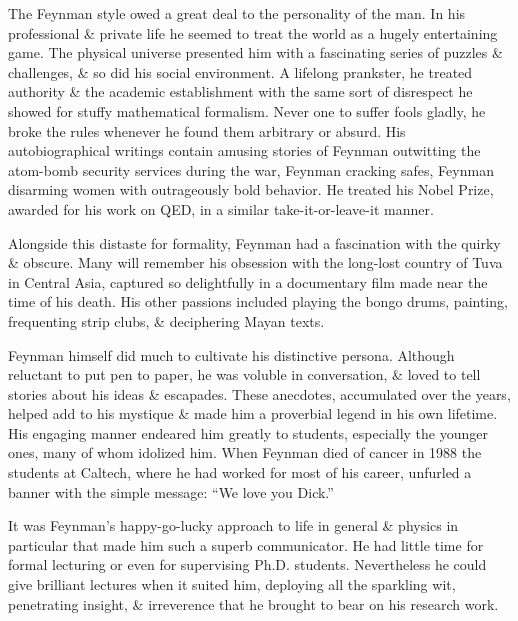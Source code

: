 \documentclass{article}
\begin{document}
The {\sc Feynman} style owed a great deal to the personality of the man. In his professional \& private life he seemed to treat the world as a hugely entertaining game. The physical universe presented him with a fascinating series of puzzles \& challenges, \& so did his social environment. A lifelong prankster, he treated authority \& the academic establishment with the same sort of disrespect he showed for stuffy mathematical formalism. Never one to suffer fools gladly, he broke the rules whenever he found them arbitrary or absurd. His autobiographical writings contain amusing stories of {\sc Feynman} outwitting the atom-bomb security services during the war, {\sc Feynman} cracking safes, {\sc Feynman} disarming women with outrageously bold behavior. He treated his Nobel Prize, awarded for his work on QED, in a similar take-it-or-leave-it manner.

Alongside this distaste for formality, {\sc Feynman} had a fascination with the quirky \& obscure. Many will remember his obsession with the long-lost country of Tuva in Central Asia, captured so delightfully in a documentary film made near the time of his death. His other passions included playing the bongo drums, painting, frequenting strip clubs, \& deciphering Mayan texts.

{\sc Feynman} himself did much to cultivate his distinctive persona. Although reluctant to put pen to paper, he was voluble in conversation, \& loved to tell stories about his ideas \& escapades. These anecdotes, accumulated over the years, helped add to his mystique \& made him a proverbial legend in his own lifetime. His engaging manner endeared him greatly to students, especially the younger ones, many of whom idolized him. When {\sc Feynman} died of cancer in 1988 the students at Caltech, where he had worked for most of his career, unfurled a banner with the simple message: ``We love you Dick.''

It was {\sc Feynman}'s happy-go-lucky approach to life in general \& physics in particular that made him such a superb communicator. He had little time for formal lecturing or even for supervising Ph.D. students. Nevertheless he could give brilliant lectures when it suited him, deploying all the sparkling wit, penetrating insight, \& irreverence that he brought to bear on his research work.
\end{document}
